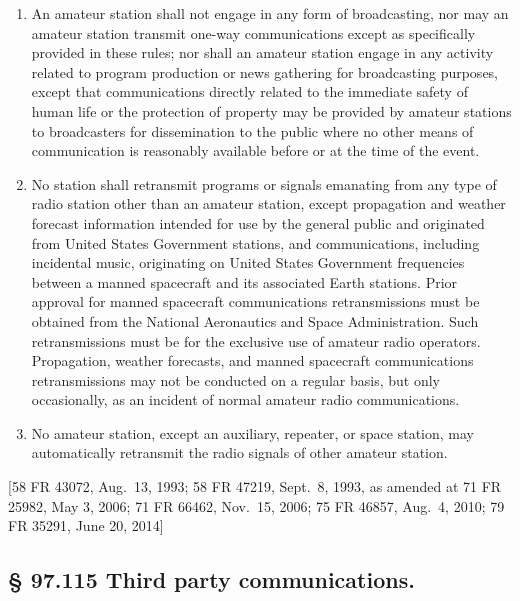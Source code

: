 \documentclass[
  letterpaper,
  DIV=11,
  numbers=noendperiod]{scrreport}
\begin{document}
\begin{enumerate}
\def\labelenumi{(\alph{enumi})}
\setcounter{enumi}{1}
\item
  An amateur station shall not engage in any form of broadcasting, nor
  may an amateur station transmit one-way communications except as
  specifically provided in these rules; nor shall an amateur station
  engage in any activity related to program production or news gathering
  for broadcasting purposes, except that communications directly related
  to the immediate safety of human life or the protection of property
  may be provided by amateur stations to broadcasters for dissemination
  to the public where no other means of communication is reasonably
  available before or at the time of the event.
\item
  No station shall retransmit programs or signals emanating from any
  type of radio station other than an amateur station, except
  propagation and weather forecast information intended for use by the
  general public and originated from United States Government stations,
  and communications, including incidental music, originating on United
  States Government frequencies between a manned spacecraft and its
  associated Earth stations. Prior approval for manned spacecraft
  communications retransmissions must be obtained from the National
  Aeronautics and Space Administration. Such retransmissions must be for
  the exclusive use of amateur radio operators. Propagation, weather
  forecasts, and manned spacecraft communications retransmissions may
  not be conducted on a regular basis, but only occasionally, as an
  incident of normal amateur radio communications.
\item
  No amateur station, except an auxiliary, repeater, or space station,
  may automatically retransmit the radio signals of other amateur
  station.
\end{enumerate}

{[}58 FR 43072, Aug.~13, 1993; 58 FR 47219, Sept.~8, 1993, as amended at
71 FR 25982, May 3, 2006; 71 FR 66462, Nov.~15, 2006; 75 FR 46857,
Aug.~4, 2010; 79 FR 35291, June 20, 2014{]}

\hypertarget{third-party-communications.}{%
\subsection*{§ 97.115 Third party
communications.}\label{third-party-communications.}}
\end{document}
